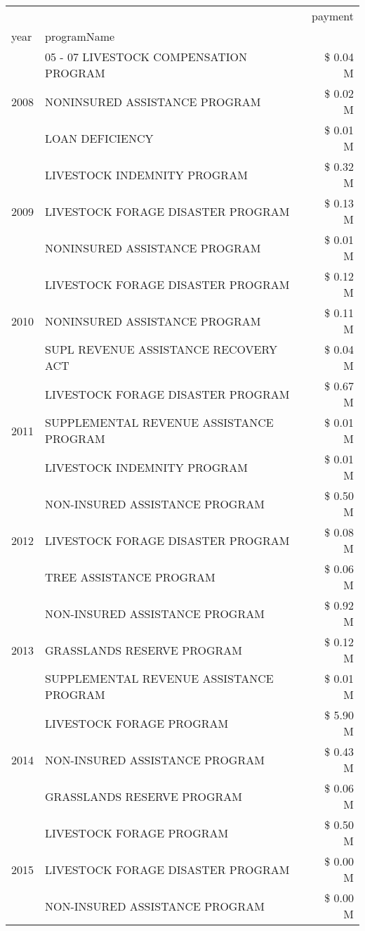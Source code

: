 \begin{tabular}{llr}
\toprule
 &  & payment \\
year & programName &  \\
\midrule
\multirow[t]{3}{*}{2008} & 05 - 07 LIVESTOCK COMPENSATION PROGRAM & \$ 0.04 M \\
 & NONINSURED ASSISTANCE PROGRAM & \$ 0.02 M \\
 & LOAN DEFICIENCY & \$ 0.01 M \\
\cline{1-3}
\multirow[t]{3}{*}{2009} & LIVESTOCK INDEMNITY PROGRAM & \$ 0.32 M \\
 & LIVESTOCK FORAGE DISASTER  PROGRAM & \$ 0.13 M \\
 & NONINSURED ASSISTANCE PROGRAM & \$ 0.01 M \\
\cline{1-3}
\multirow[t]{3}{*}{2010} & LIVESTOCK FORAGE DISASTER  PROGRAM & \$ 0.12 M \\
 & NONINSURED ASSISTANCE PROGRAM & \$ 0.11 M \\
 & SUPL REVENUE ASSISTANCE RECOVERY ACT & \$ 0.04 M \\
\cline{1-3}
\multirow[t]{3}{*}{2011} & LIVESTOCK FORAGE DISASTER PROGRAM & \$ 0.67 M \\
 & SUPPLEMENTAL REVENUE ASSISTANCE PROGRAM & \$ 0.01 M \\
 & LIVESTOCK INDEMNITY PROGRAM & \$ 0.01 M \\
\cline{1-3}
\multirow[t]{3}{*}{2012} & NON-INSURED ASSISTANCE PROGRAM & \$ 0.50 M \\
 & LIVESTOCK FORAGE DISASTER PROGRAM & \$ 0.08 M \\
 & TREE ASSISTANCE PROGRAM & \$ 0.06 M \\
\cline{1-3}
\multirow[t]{3}{*}{2013} & NON-INSURED ASSISTANCE PROGRAM & \$ 0.92 M \\
 & GRASSLANDS RESERVE PROGRAM & \$ 0.12 M \\
 & SUPPLEMENTAL REVENUE ASSISTANCE PROGRAM & \$ 0.01 M \\
\cline{1-3}
\multirow[t]{3}{*}{2014} & LIVESTOCK FORAGE PROGRAM & \$ 5.90 M \\
 & NON-INSURED ASSISTANCE PROGRAM & \$ 0.43 M \\
 & GRASSLANDS RESERVE PROGRAM & \$ 0.06 M \\
\cline{1-3}
\multirow[t]{3}{*}{2015} & LIVESTOCK FORAGE PROGRAM & \$ 0.50 M \\
 & LIVESTOCK FORAGE DISASTER PROGRAM & \$ 0.00 M \\
 & NON-INSURED ASSISTANCE PROGRAM & \$ 0.00 M \\

\end{tabular}

